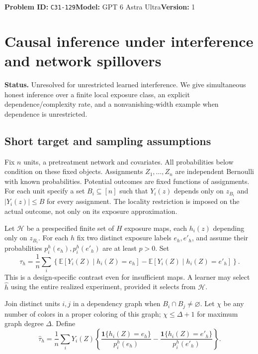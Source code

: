 \documentclass[11pt,a4paper]{article}
\newcommand{\E}{\mathbb E}
\newcommand{\ind}{\mathbf 1}
\begin{document}
\noindent\textbf{Problem ID:} \texttt{C31-129}\quad\textbf{Model:} GPT 6 Astra Ultra\quad\textbf{Version:} 1\par
\section*{Causal inference under interference and network spillovers}

\textbf{Status.} Unresolved for unrestricted learned interference. We give simultaneous honest inference over a finite local exposure class, an explicit dependence/complexity rate, and a nonvanishing-width example when dependence is unrestricted.

\subsection*{Short target and sampling assumptions}
Fix $n$ units, a pretreatment network and covariates. All probabilities below condition on these fixed objects. Assignments $Z_1,\ldots,Z_n$ are independent Bernoulli with known probabilities. Potential outcomes are fixed functions of assignments. For each unit specify a set $B_i\subseteq[n]$ such that $Y_i(z)$ depends only on $z_{B_i}$ and $|Y_i(z)|\leq B$ for every assignment. The locality restriction is imposed on the actual outcome, not only on its exposure approximation.

Let $\mathcal H$ be a prespecified finite set of $H$ exposure maps, each $h_i(z)$ depending only on $z_{B_i}$. For each $h$ fix two distinct exposure labels $e_h,e'_h$, and assume their probabilities $p_i^h(e_h),p_i^h(e'_h)$ are at least $p>0$. Set
\[
 \tau_h=\frac1n\sum_i\left\{\E[Y_i(Z)\mid h_i(Z)=e_h]
             -\E[Y_i(Z)\mid h_i(Z)=e'_h]\right\}.
\]
This is a design-specific contrast even for insufficient maps. A learner may select $\widehat h$ using the entire realized experiment, provided it selects from $\mathcal H$.

Join distinct units $i,j$ in a dependency graph when $B_i\cap B_j\ne\varnothing$. Let $\chi$ be any number of colors in a proper coloring of this graph; $\chi\leq\Delta+1$ for maximum graph degree $\Delta$. Define
\[
 \widehat\tau_h=\frac1n\sum_iY_i(Z)
 \left\{\frac{\ind\{h_i(Z)=e_h\}}{p_i^h(e_h)}
       -\frac{\ind\{h_i(Z)=e'_h\}}{p_i^h(e'_h)}\right\}.
\]
\end{document}
